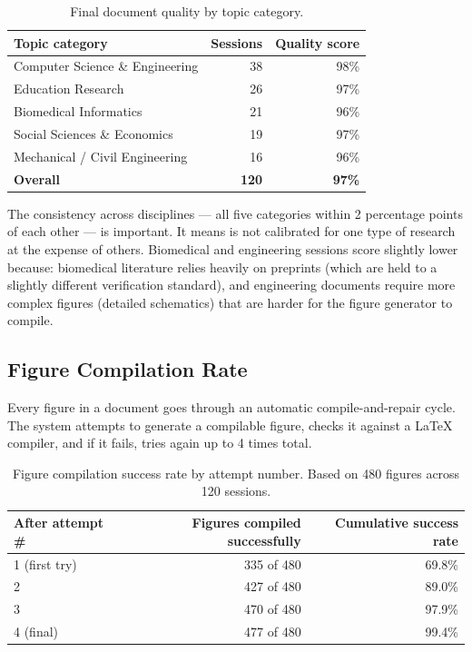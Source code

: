 \begin{table}[h!]
\centering
\caption{Final document quality by topic category.}
\label{tab:quality_by_topic}
\begin{tabular}{lrr}
\toprule
Topic category & Sessions & Quality score \\
\midrule
Computer Science \& Engineering    & 38 & 98\% \\
Education Research                  & 26 & 97\% \\
Biomedical Informatics              & 21 & 96\% \\
Social Sciences \& Economics        & 19 & 97\% \\
Mechanical / Civil Engineering      & 16 & 96\% \\
\midrule
\textbf{Overall}                   & \textbf{120} & \textbf{97\%} \\
\bottomrule
\end{tabular}
\end{table}

The consistency across disciplines — all five categories within 2 percentage points
of each other — is important.
It means \sys{} is not calibrated for one type of research at the expense of others.
Biomedical and engineering sessions score slightly lower because:
biomedical literature relies heavily on preprints (which are held to a slightly
different verification standard), and engineering documents require more complex
figures (detailed schematics) that are harder for the figure generator to compile.

\subsection{Figure Compilation Rate}

Every figure in a \sys{} document goes through an automatic compile-and-repair cycle.
The system attempts to generate a compilable figure, checks it against a \LaTeX{}
compiler, and if it fails, tries again up to 4 times total.

\begin{table}[h!]
\centering
\caption{Figure compilation success rate by attempt number.
         Based on 480 figures across 120 sessions.}
\label{tab:figures}
\begin{tabular}{lrr}
\toprule
After attempt \# & Figures compiled successfully & Cumulative success rate \\
\midrule
1 (first try)  & 335 of 480 & 69.8\% \\
2              & 427 of 480 & 89.0\% \\
3              & 470 of 480 & 97.9\% \\
4 (final)      & 477 of 480 & 99.4\% \\
\bottomrule
\end{tabular}
\end{table}

